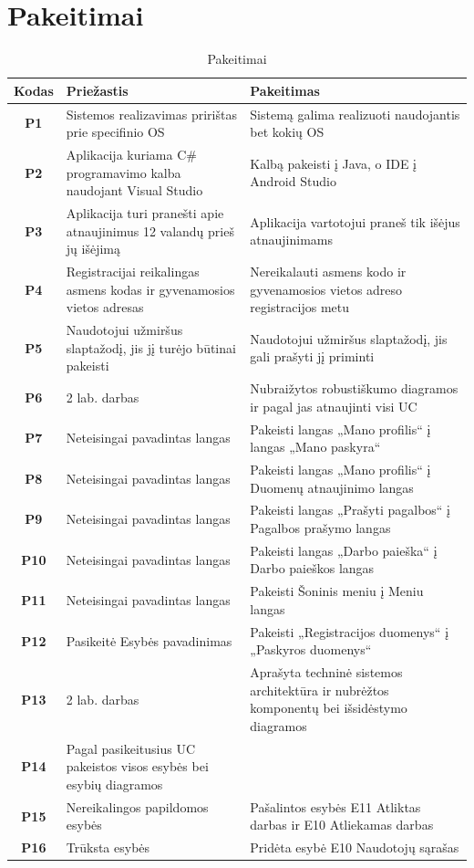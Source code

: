 \documentclass{VUMIFPSbakalaurinis}
\begin{document}
\appendix
\section{Pakeitimai}
\begin{table}[H]\footnotesize
	\centering
	\caption{Pakeitimai}
	{
	\setlength{\arrayrulewidth}{0.25mm}
	{\begin{tabular}{|c|m{5.75cm}|m{5.75cm}|} \hline
		Kodas & Priežastis & Pakeitimas \\
		\hline
		\textbf{P1} & Sistemos realizavimas pririštas prie specifinio OS & Sistemą galima realizuoti naudojantis bet kokių OS \\
		\textbf{P2} & Aplikacija kuriama C\# programavimo kalba naudojant Visual Studio & Kalbą pakeisti į Java, o IDE į Android Studio \\
		\textbf{P3} & Aplikacija turi pranešti apie atnaujinimus 12 valandų prieš jų išėjimą & Aplikacija vartotojui praneš tik išėjus atnaujinimams \\
		\textbf{P4} & Registracijai reikalingas asmens kodas ir gyvenamosios vietos adresas & Nereikalauti asmens kodo ir gyvenamosios vietos adreso registracijos metu \\
		\textbf{P5} & Naudotojui užmiršus slaptažodį, jis jį turėjo būtinai pakeisti & Naudotojui užmiršus slaptažodį, jis gali prašyti jį priminti \\
		\textbf{P6} & 2 lab. darbas & Nubraižytos robustiškumo diagramos ir pagal jas atnaujinti visi UC \\
		\textbf{P7} & Neteisingai pavadintas langas & Pakeisti langas  „Mano profilis“ į  langas „Mano paskyra“ \\
		\textbf{P8} & Neteisingai pavadintas langas & Pakeisti langas  „Mano profilis“ į Duomenų atnaujinimo langas \\
		\textbf{P9} & Neteisingai pavadintas langas & Pakeisti langas  „Prašyti pagalbos“ į Pagalbos prašymo langas \\
		\textbf{P10} & Neteisingai pavadintas langas & Pakeisti langas  „Darbo paieška“ į Darbo paieškos langas \\
		\textbf{P11} & Neteisingai pavadintas langas & Pakeisti Šoninis meniu į Meniu langas \\
		\textbf{P12} & Pasikeitė Esybės pavadinimas & Pakeisti „Registracijos duomenys“ į „Paskyros duomenys“ \\
		\textbf{P13} & 2 lab. darbas & Aprašyta techninė sistemos architektūra ir nubrėžtos komponentų bei išsidėstymo diagramos \\
		\textbf{P14} & Pagal pasikeitusius UC pakeistos visos esybės bei esybių diagramos & \\
		\textbf{P15} & Nereikalingos papildomos esybės & Pašalintos esybės E11 Atliktas darbas ir E10 Atliekamas darbas \\
		\textbf{P16} & Trūksta esybės & Pridėta esybė E10 Naudotojų sąrašas \\
		\hline
	\end{tabular}}
	}
	\label{tab:mistake table}
\end{table}
\end{document}
